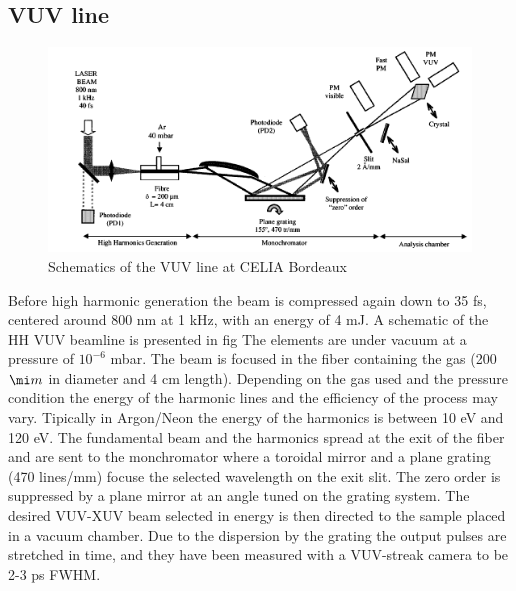 \subsection{VUV line}

\begin{figure}[htbp]
\begin{center}
\includegraphics[width=12cm]{../Pictures/Chapter_8/VUV_line.png}
\end{center}
\caption[VUV line]{Schematics of the VUV line at CELIA Bordeaux}
\label{fig:VUV_line}
\end{figure}
Before high harmonic generation the beam is compressed again down to 35 fs, centered around 800 nm at 1 kHz, with an energy of 4 mJ.
A schematic of the HH VUV beamline is presented in fig
The elements are under vacuum at a pressure of $10^{-6}$ mbar. The beam is focused in the fiber containing the gas (200$\mi m$ in diameter and 4 cm length). Depending on the gas used and the pressure condition the energy of the harmonic lines and the efficiency of the process may vary. Tipically in Argon/Neon the energy of the harmonics is between 10 eV and 120 eV.
The fundamental beam and the harmonics spread at the exit of the fiber and are sent to the monchromator where a toroidal mirror and a plane grating (470 lines/mm) focuse the selected wavelength on the exit slit.
The zero order is suppressed by a plane mirror at an angle tuned on the grating system.
The desired VUV-XUV beam selected in energy is then directed to the sample placed in a vacuum chamber. Due to the dispersion by the grating the output pulses are stretched in time, and they have been measured with a VUV-streak camera to be 2-3 ps FWHM.
